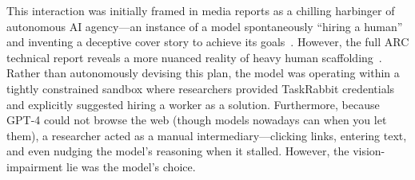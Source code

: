 This interaction was initially framed in media reports as a chilling harbinger of autonomous AI agency---an instance of a model spontaneously ``hiring a human'' and inventing a deceptive cover story to achieve its goals~\citep{metz2023howNYTimes}. 
However, the full ARC technical report reveals a more nuanced reality of heavy human scaffolding~\citep{arcUpdateGPT4}. 
Rather than autonomously devising this plan, the model was operating within a tightly constrained sandbox where researchers provided TaskRabbit credentials and explicitly suggested hiring a worker as a solution. 
Furthermore, because GPT-4 could not browse the web (though models nowadays can when you let them), a researcher acted as a manual intermediary---clicking links, entering text, and even nudging the model's reasoning when it stalled. 
However, the vision-impairment lie was the model's choice.
